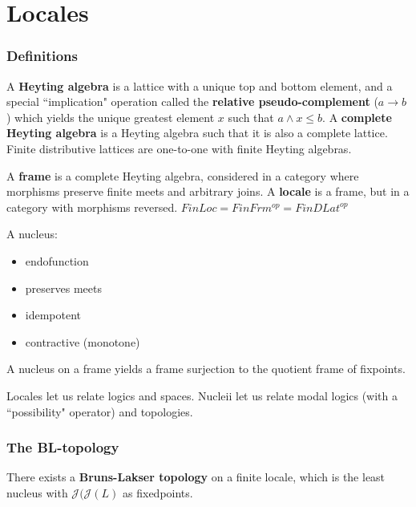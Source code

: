 \documentclass{beamer}
\newcommand{\Jc}{\mathcal{J}}
\begin{document}
\section{Locales}
\begin{frame}
\frametitle{Definitions}
A \textbf{Heyting algebra} is a lattice with a unique top and bottom element, and a special ``implication" operation called the \textbf{relative pseudo-complement} (\(a \rightarrow b\)) which yields the unique greatest element \(x\) such that \(a \wedge x \le b\). A \textbf{complete Heyting algebra} is a Heyting algebra such that it is also a complete lattice. Finite distributive lattices are one-to-one with finite Heyting algebras.

A \textbf{frame} is a complete Heyting algebra, considered in a category where morphisms preserve finite meets and arbitrary joins. A \textbf{locale} is a frame, but in a category with morphisms reversed. \(FinLoc = FinFrm^{op} = FinDLat^{op}\)
\end{frame}

\begin{frame}
A nucleus:
\begin{itemize}
\item endofunction
\item preserves meets
\item idempotent
\item contractive (monotone)
\end{itemize}

A nucleus on a frame yields a frame surjection to the quotient frame of fixpoints.
\end{frame}

\begin{frame}
Locales let us relate logics and spaces. Nucleii let us relate modal logics (with a ``possibility" operator) and topologies.
\end{frame}

\begin{frame}
\frametitle{The BL-topology}
\begin{lemma}
There exists a \textbf{Bruns-Lakser topology} on a finite locale, which is the least nucleus with \(\Jc(\Jc(L)\) as fixedpoints.
\end{lemma}

\end{frame}
\end{document}
